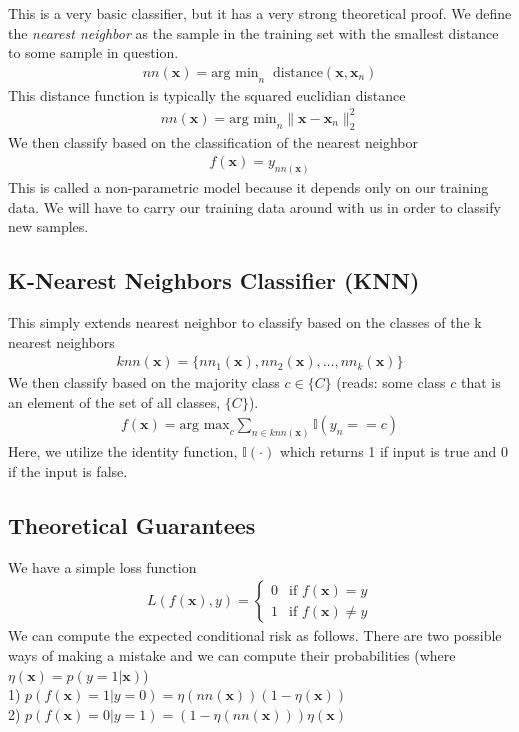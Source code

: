 \documentclass[11pt]{article}
\newcommand{\vct}[1]{\boldsymbol{#1}} %
\newcommand{\ProbOpr}[1]{\mathbb{#1}}
\begin{document}
This is a very basic classifier, but it has a very strong theoretical proof. We define the {\it nearest neighbor} as the sample in the training set with the smallest distance to some sample in question.
\begin{align*}
nn(\vct{x}) = \text{arg min}_n \;\; \text{distance}(\vct{x}, \vct{x}_n)
\end{align*}
This distance function is typically the squared euclidian distance
\begin{align*}
nn(\vct{x}) = \text{arg min}_n \| \vct{x} - \vct{x}_n \|_2^2
\end{align*}
We then classify based on the classification of the nearest neighbor
\begin{align*}
f(\vct{x}) = y_{nn(\vct{x})}
\end{align*}
This is called a non-parametric model because it depends only on our training data. We will have to carry our training data around with us in order to classify new samples.

\subsection{K-Nearest Neighbors Classifier (KNN)}
This simply extends nearest neighbor to classify based on the classes of the k nearest neighbors
\begin{align*}
knn(\vct{x}) = \{ nn_1(\vct{x}), nn_2(\vct{x}), \hdots, nn_k(\vct{x}) \}
\end{align*}
We then classify based on the majority class $c \in \{C\}$ (reads: some class $c$ that is an element of the set of all classes, $\{C\}$).
\begin{align*}
f(\vct{x}) = \text{arg max}_c \sum_{n \in knn(\vct{x})} \ProbOpr{I}(y_n == c)
\end{align*}
Here, we utilize the identity function, $\ProbOpr{I}(\cdot)$ which returns 1 if input is true and 0 if the input is false.

\subsection{Theoretical Guarantees}
We have a simple loss function
\begin{align*}
L(f(\vct{x}),y) = \begin{cases} 0 & \text{if } f(\vct{x}) = y \\ 1  & \text{if } f(\vct{x}) \ne y \end{cases}
\end{align*}
We can compute the expected conditional risk as follows. There are two possible ways of making a mistake and we can compute their probabilities (where $\eta(\vct{x}) = p(y=1|\vct{x})$)\\
1) $p(f(\vct{x}) = 1 | y = 0) = \eta(nn(\vct{x}))(1- \eta(\vct{x}))$\\
2) $p(f(\vct{x}) = 0 | y = 1) = (1- \eta(nn(\vct{x})))\eta(\vct{x})$\\
\end{document}
